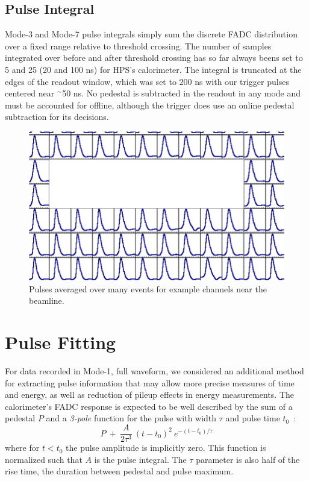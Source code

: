\documentclass[amsmath,amssymb,notitlepage,12pt]{revtex4-1}
\begin{document}
\subsection{Pulse Integral}
Mode-3 and Mode-7 pulse integrals simply sum the discrete FADC distribution over a fixed range relative to threshold crossing.  The number of samples integrated over before and after threshold crossing has so far always beens set to 5 and 25 (20 and 100 ns) for HPS's calorimeter.  The integral is truncated at the edges of the readout window, which was set to 200 ns with our trigger pulses centered near $^\sim$50 ns. No pedestal is subtracted in the readout in any mode and must be accounted for offline, although the trigger does use an online pedestal subtraction for its decisions.  
\begin{figure}[htbp]\centering
  \includegraphics[width=12cm,trim={0 0 0 0.2cm},clip]{pics/avgpulses.png}
  \caption{Pulses averaged over many events for example channels near the beamline.\label{fig:avgPulses}}
\end{figure}

\section{Pulse Fitting}
For data recorded in Mode-1, full waveform, we considered an additional method for extracting pulse information that may allow more precise measures of time and
energy, as well as reduction of pileup effects in energy measurements.  
The calorimeter's FADC response is expected to be well described by the sum of a pedestal $P$ and a {\em 3-pole} function for the pulse with width $\tau$ and pulse time $t_0$~\cite{hpsnote2014002}:
\begin{equation}
  P\ +\ \frac{A}{2\tau^3}\ (t-t_0)^2\ e^{-(t-t_0)/\tau}
  \label{eqn:3pole}
\end{equation}
where for $t<t_0$ the pulse amplitude is implicitly zero.  This function is normalized such that $A$ is the pulse integral.  The $\tau$ parameter is also half of the rise time, the duration between pedestal and pulse maximum.
\end{document}
